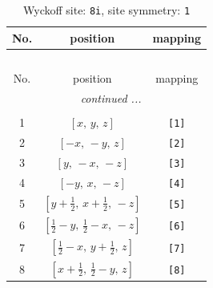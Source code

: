 \documentclass[fleqn,8pt]{jsarticle}
\begin{document}
\renewcommand{\arraystretch}{1.2}
\begin{longtable}{ccc}
\caption{Wyckoff site: {\tt 8i}, site symmetry: {\tt 1}}
 \\
 \hline \hline
No. & position & mapping \\ \hline \endfirsthead

\multicolumn{2}{l}{\tablename\ \thetable{}} \\
 \hline \hline
No. & position & mapping \\ \hline \endhead

 \hline \hline
\multicolumn{2}{r}{\footnotesize\it continued ...} \\ \endfoot

 \hline \hline
\multicolumn{2}{r}{} \\ \endlastfoot

1 & $\left[ x,\, y,\, z \right]$ & {\tt [1]} \\ \hline
2 & $\left[ - x,\, - y,\, z \right]$ & {\tt [2]} \\ \hline
3 & $\left[ y,\, - x,\, - z \right]$ & {\tt [3]} \\ \hline
4 & $\left[ - y,\, x,\, - z \right]$ & {\tt [4]} \\ \hline
5 & $\left[ y + \frac{1}{2},\, x + \frac{1}{2},\, - z \right]$ & {\tt [5]} \\ \hline
6 & $\left[ \frac{1}{2} - y,\, \frac{1}{2} - x,\, - z \right]$ & {\tt [6]} \\ \hline
7 & $\left[ \frac{1}{2} - x,\, y + \frac{1}{2},\, z \right]$ & {\tt [7]} \\ \hline
8 & $\left[ x + \frac{1}{2},\, \frac{1}{2} - y,\, z \right]$ & {\tt [8]} \\
\end{longtable}
\end{document}

